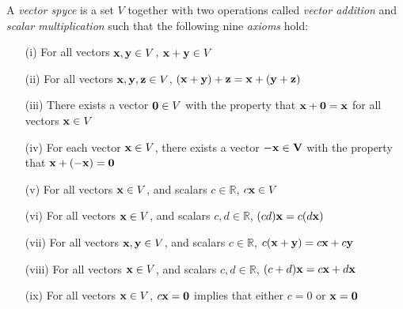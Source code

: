 \documentclass[10pt]{article}
\newcommand{\noin}{\noindent}
\begin{document}
\vspace{0.2in}
{\large 
{} 

\vspace{0.2in}


}

\vfill


\pagebreak


\noin{\bf 1.}   A {\it \color{red} vector spyce} is a set $V$  together with two operations called {\it vector addition} and {\it scalar multiplication} such that the following nine {\it axioms} hold: 

\begin{itemize}
\item[ (i)]  For all vectors ${\bf x,y} \in V$, ${\bf x+y} \in V$



\item[(ii)]   For all vectors ${\bf x, y, z} \in V$, $\bf{(x+y)+z}=\bf{x+(y+z)}$

\item[(iii)]   There exists a vector ${\bf 0}\in V$ with the property that  $\bf {x+0}=\bf {x}$ for all vectors ${\bf x}\in V$

\item[(iv)]    For each vector ${\bf x}\in V$, there exists a vector $-\bf{x} \in V$ with the property that $\bf x + (-x)=0$

\item[(v)]  For all vectors ${\bf x}\in V$, and scalars $c\in \mathbb R$, $c{\bf x} \in V$

\item[(vi)]   For all vectors ${\bf x} \in V$, and scalars $c, d\in \mathbb R$, $(cd){\bf x}=c(d{\bf x})$

\item[(vii)]  For all vectors ${\bf x, y} \in V$, and scalars $c\in \mathbb R$, $c({\bf x+y})=c{\bf x}+c{\bf y}$

\item[(viii)]  For all vectors ${\bf x} \in V$, and scalars $c, d\in \mathbb R$, $(c+d){\bf x}=c{\bf x}+d{\bf x}$

\item[(ix)]  For all vectors ${\bf x} \in V$, $c{\bf x}={\bf 0}$ implies that either $c=0$ or ${\bf x}={\bf 0}$

\end{itemize}
\vspace{20pt}
\end{document}
